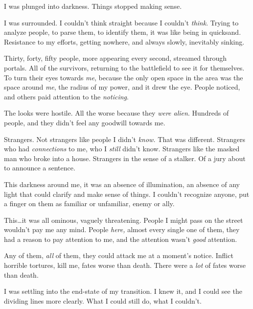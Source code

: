 





I was plunged into darkness.  Things stopped making sense.



I was surrounded.  I couldn't think straight because I couldn't \emph{think}.  Trying to analyze people, to parse them, to identify them, it was like being in quicksand.  Resistance to my efforts, getting nowhere, and always slowly, inevitably sinking.



Thirty, forty, fifty people, more appearing every second, streamed through portals.  All of the survivors, returning to the battlefield to see it for themselves.  To turn their eyes towards \emph{me}, because the only open space in the area was the space around \emph{me}, the radius of my power, and it drew the eye.  People noticed, and others paid attention to the \emph{noticing}.



The looks were hostile.  All the worse because they \emph{were alien}.  Hundreds of people, and they didn't feel any goodwill towards me.



Strangers.  Not strangers like people I didn't \emph{know. } That was different.  Strangers who had \emph{connections} to me, who I \emph{still} didn't know.  Strangers like the masked man who broke into a house.  Strangers in the sense of a stalker.  Of a jury about to announce a sentence.



This darkness around me, it was an absence of illumination, an absence of any light that could clarify and make sense of things.  I couldn't recognize anyone, put a finger on them as familiar or unfamiliar, enemy or ally.



This\ldots it was all ominous, vaguely threatening.  People I might pass on the street wouldn't pay me any mind.  People \emph{here,} almost every single one of them, they had a reason to pay attention to me, and the attention wasn't \emph{good} attention.



Any of them, \emph{all} of them, they could attack me at a moment's notice.  Inflict horrible tortures, kill me, fates worse than death.  There were a \emph{lot} of fates worse than death.



I was settling into the end-state of my transition.  I knew it, and I could see the dividing lines more clearly.  What I could still do, what I couldn't.



